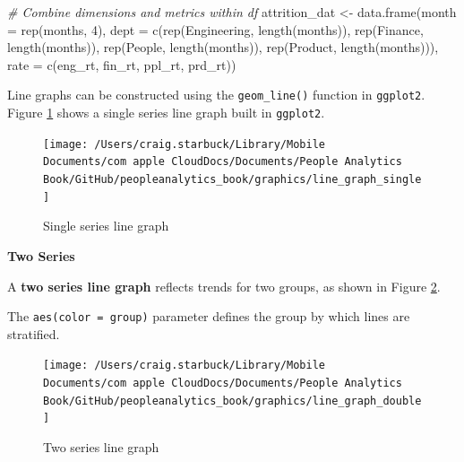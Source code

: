 \documentclass[
]{book}
\newenvironment{Shaded}{\begin{snugshade}}{\end{snugshade}}
\newcommand{\AttributeTok}[1]{\textcolor[rgb]{0.77,0.63,0.00}{#1}}
\newcommand{\CommentTok}[1]{\textcolor[rgb]{0.56,0.35,0.01}{\textit{#1}}}
\newcommand{\DecValTok}[1]{\textcolor[rgb]{0.00,0.00,0.81}{#1}}
\newcommand{\FunctionTok}[1]{\textcolor[rgb]{0.00,0.00,0.00}{#1}}
\newcommand{\NormalTok}[1]{#1}
\newcommand{\OtherTok}[1]{\textcolor[rgb]{0.56,0.35,0.01}{#1}}
\newcommand{\StringTok}[1]{\textcolor[rgb]{0.31,0.60,0.02}{#1}}
\begin{document}
\begin{Shaded}
\begin{Highlighting}[]
\CommentTok{\# Combine dimensions and metrics within df}
\NormalTok{attrition\_dat }\OtherTok{\textless{}{-}} \FunctionTok{data.frame}\NormalTok{(}\AttributeTok{month =} \FunctionTok{rep}\NormalTok{(months, }\DecValTok{4}\NormalTok{),}
                            \AttributeTok{dept =} \FunctionTok{c}\NormalTok{(}\FunctionTok{rep}\NormalTok{(}\StringTok{\textquotesingle{}Engineering\textquotesingle{}}\NormalTok{, }\FunctionTok{length}\NormalTok{(months)), }
                                     \FunctionTok{rep}\NormalTok{(}\StringTok{\textquotesingle{}Finance\textquotesingle{}}\NormalTok{, }\FunctionTok{length}\NormalTok{(months)),}
                                     \FunctionTok{rep}\NormalTok{(}\StringTok{\textquotesingle{}People\textquotesingle{}}\NormalTok{, }\FunctionTok{length}\NormalTok{(months)),}
                                     \FunctionTok{rep}\NormalTok{(}\StringTok{\textquotesingle{}Product\textquotesingle{}}\NormalTok{, }\FunctionTok{length}\NormalTok{(months))),}
                            \AttributeTok{rate =} \FunctionTok{c}\NormalTok{(eng\_rt,}
\NormalTok{                                     fin\_rt,}
\NormalTok{                                     ppl\_rt,}
\NormalTok{                                     prd\_rt))}
\end{Highlighting}
\end{Shaded}

Line graphs can be constructed using the \texttt{geom\_line()} function in \texttt{ggplot2}. Figure \ref{fig:single-line-graph} shows a single series line graph built in \texttt{ggplot2}.

\begin{figure}

{\centering \texttt{[image: /Users/craig.starbuck/Library/Mobile Documents/com~apple~CloudDocs/Documents/People Analytics Book/GitHub/peopleanalytics\_book/graphics/line\_graph\_single]} 

}

\caption{Single series line graph}\label{fig:single-line-graph}
\end{figure}

\textbf{Two Series}

A \textbf{two series line graph} reflects trends for two groups, as shown in Figure \ref{fig:dbl-line-graph}.

The \texttt{aes(color\ =\ group)} parameter defines the group by which lines are stratified.

\begin{figure}

{\centering \texttt{[image: /Users/craig.starbuck/Library/Mobile Documents/com~apple~CloudDocs/Documents/People Analytics Book/GitHub/peopleanalytics\_book/graphics/line\_graph\_double]} 

}

\caption{Two series line graph}\label{fig:dbl-line-graph}
\end{figure}
\end{document}
